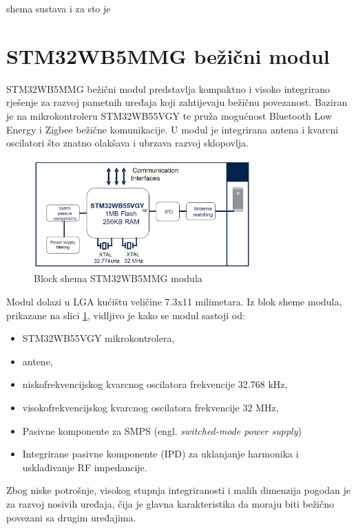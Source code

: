 \documentclass[../diplomski_rad.tex]{subfiles}
\begin{document}
\sloppy

\justifying

shema sustava i za sto je

\section{STM32WB5MMG bežični modul}

STM32WB5MMG bežični modul predstavlja kompaktno i visoko integrirano rješenje za razvoj pametnih uređaja koji zahtijevaju bežičnu povezanost. 
Baziran je na mikrokontroleru STM32WB55VGY te pruža mogućnost Bluetooth Low Energy i Zigbee bežične komunikacije. 
U modul je integrirana antena i kvarcni oscilatori što znatno olakšava i ubrzava razvoj sklopovlja.  

\begin{figure}[htb]
    \centering
    \includegraphics[width=0.75\textwidth]{Figures/stm32module.png} 
    \caption{Block shema STM32WB5MMG modula \cite{stm32module}}
    \label{slk:stm32module}
\end{figure}

Modul dolazi u LGA kućištu veličine 7.3x11 milimetara. Iz blok sheme modula, prikazane na slici \ref{slk:stm32module}, 
vidljivo je kako se modul sastoji od:
\begin{itemize}
    \item STM32WB55VGY mikrokontrolera,
    \item antene,
    \item niskofrekvencijskog kvarcnog oscilatora frekvencije 32.768 kHz,
    \item visokofrekvencijskog kvarcnog oscilatora frekvencije 32 MHz,
    \item Pasivne komponente za SMPS (engl. \textit{switched-mode power supply}) 
    \item Integrirane pasivne komponente (IPD) za uklanjanje harmonika i usklađivanje RF impedancije.     
  \end{itemize} 
Zbog niske potrošnje, visokog stupnja integriranosti i malih dimenzija pogodan je za razvoj nosivih uređaja, 
čija je glavna karakteristika da moraju biti bežično povezani sa drugim uređajima. 
\end{document}
